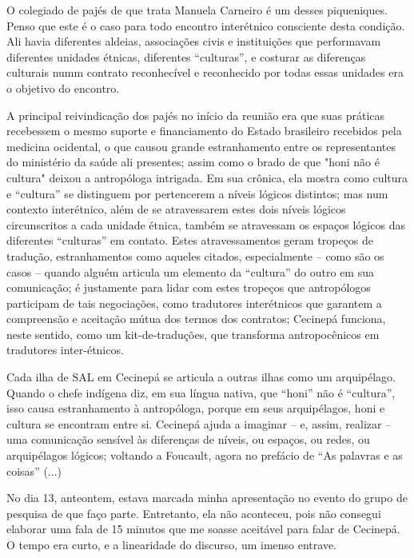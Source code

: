 O colegiado de pajés de que trata Manuela Carneiro é um desses piqueniques. Penso que este é o caso para todo encontro interétnico consciente desta condição. Ali havia diferentes aldeias, associações civis e instituições que performavam diferentes unidades étnicas, diferentes \enquote{culturas}, e costurar as diferenças culturais numm contrato reconhecível e reconhecido por todas essas unidades era o objetivo do encontro.

A principal reivindicação dos pajés no início da reunião era que suas práticas recebessem o mesmo suporte e financiamento do Estado brasileiro recebidos pela medicina ocidental, o que causou grande estranhamento entre os representantes do ministério da saúde ali presentes; assim como o brado de que "honi não é cultura" deixou a antropóloga intrigada. Em sua crônica, ela mostra como cultura e \enquote{cultura} se distinguem por pertencerem a níveis lógicos distintos; mas num contexto interétnico, além de se atravessarem estes dois níveis lógicos circunscritos a cada unidade étnica, também se atravessam os espaços lógicos das diferentes \enquote{culturas} em contato. Estes atravessamentos geram tropeços de tradução, estranhamentos como aqueles citados, especialmente -- como são os casos -- quando alguém articula um elemento da \enquote{cultura} do outro em sua comunicação; é justamente para lidar com estes tropeços que antropólogos participam de tais negociações, como tradutores interétnicos que garantem a compreensão e aceitação mútua dos termos dos contratos; Cecinepá funciona, neste sentido, como um kit-de-traduções, que transforma antropocênicos em tradutores inter-étnicos.

Cada ilha de SAL em Cecinepá se articula a outras ilhas como um arquipélago. Quando o chefe indígena diz, em sua língua nativa, que \enquote{honi} não é \enquote{cultura}, isso causa estranhamento à antropóloga, porque em seus arquipélagos, honi e cultura se encontram entre si. Cecinepá ajuda a imaginar -- e, assim, realizar -- uma comunicação sensível às diferenças de níveis, ou espaços, ou redes, ou arquipélagos lógicos; voltando a Foucault, agora no prefácio de \enquote{As palavras e as coisas} (...)



No dia 13, anteontem, estava marcada minha apresentação no evento do grupo de pesquisa de que faço parte. Entretanto, ela não aconteceu, pois não consegui elaborar uma fala de 15 minutos que me soasse aceitável para falar de Cecinepá. O tempo era curto, e a linearidade do discurso, um imenso entrave.

